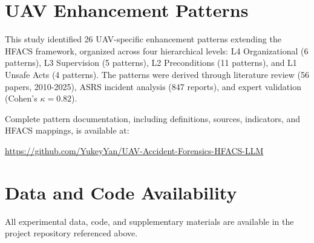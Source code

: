 
\appendix
\section{UAV Enhancement Patterns}
\label{appendix:uav_patterns}

This study identified 26 UAV-specific enhancement patterns extending the HFACS framework, organized across four hierarchical levels: L4 Organizational (6 patterns), L3 Supervision (5 patterns), L2 Preconditions (11 patterns), and L1 Unsafe Acts (4 patterns). The patterns were derived through literature review (56 papers, 2010-2025), ASRS incident analysis (847 reports), and expert validation (Cohen's $\kappa = 0.82$).

Complete pattern documentation, including definitions, sources, indicators, and HFACS mappings, is available at:

\url{https://github.com/YukeyYan/UAV-Accident-Forensics-HFACS-LLM}

\section{Data and Code Availability}
\label{appendix:data_code}

All experimental data, code, and supplementary materials are available in the project repository referenced above.
